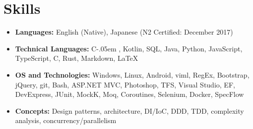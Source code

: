 \documentclass[letterpaper,11pt]{article}
\newcommand{\resumeItem}[2]{
    \vspace{-2pt}
    \item\small{
        \textbf{#1}{ #2 \vspace{-2pt}}
    }
}
\newcommand{\resumeSubItem}[2]{\resumeItem{#1}{#2}}
\def\Cplusplus{C\raisebox{0.5ex}{\tiny\textbf{++}}}
\newcommand{\Csharp}{%
  {\settoheight{\dimen0}{C}C\kern-.05em \resizebox{!}{\dimen0}{\raisebox{\depth}{\#}}}}
\begin{document}
\section{\textbf{Skills}}
\begin{itemize}
    \resumeSubItem{\textbf{Languages:}}
        {
            English (Native),
            Japanese (N2 Certified: December 2017)
        }
    \resumeSubItem{\textbf{Technical Languages:}}
        {
            \Csharp,
            Kotlin,
            SQL,
            Java,
            Python,
            JavaScript,
            TypeScript,
            \Cplusplus,
            Rust,
            Markdown,
            \LaTeX
        }
    \resumeSubItem{\textbf{OS and Technologies:}}
        {
            Windows,
            Linux,
            Android,
            viml,
            RegEx,
            Bootstrap,
            jQuery,
            git,
            Bash,
            ASP.NET MVC,
            Photoshop,
            TFS,
            Visual Studio,
            EF,
            DevExpress,
            JUnit,
            MockK,
            Moq,
            Coroutines,
            Selenium,
            Docker,
            SpecFlow
        }
    \resumeSubItem{\textbf{Concepts:}}
        {
            Design patterns,
            architecture,
            DI/IoC,
            DDD,
            TDD,
            complexity analysis,
            concurrency/parallelism
        }
 \end{itemize}

\end{document}
